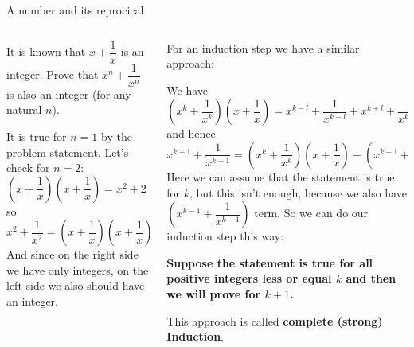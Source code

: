 \documentclass[9pt,aspectratio=169,handout]{beamer}
\begin{document}
\begin{frame}{A number and its reprocical}
  \begin{columns}[T]
    \begin{column}{0.5\textwidth}
      \begin{problem}
        It is known that $x + \dfrac{1}{x}$ is an integer. Prove that $x^{n} + \dfrac{1}{x^{n}}$ is also an integer (for any natural $n$).
      \end{problem}\pause
      It is true for $n=1$ by the problem statement. Let's check for $n=2$:
      \[
        \left(x + \dfrac{1}{x}\right) \left(x + \dfrac{1}{x}\right) = x^2 + 2 + \frac{1}{x^2},
      \] so
      \[ 
        x^2 + \frac{1}{x^2} = \left(x + \dfrac{1}{x}\right) \left(x + \dfrac{1}{x}\right) - 2.
      \]
      And since on the right side we have only integers, on the left side we also should have an integer.\pause
    \end{column}
    \begin{column}{0.5\textwidth}
      For an induction step we have a similar approach:

      We have 
      \[
        \left(x^k + \dfrac{1}{x^k}\right) \left(x + \dfrac{1}{x}\right) = x^{k-l} + \frac{1}{x^{k-l}} + x^{k+l} + \frac{1}{x^{k+1}}
      \] 
      and hence \pause
      \[
        x^{k+1} + \frac{1}{x^{k+1}} = \left(x^k + \frac{1}{x^k}\right)\left(x + \frac{1}{x}\right) - \left(x^{k-1} + \frac{1}{x^{k-1}}\right).
      \]\pause
      Here we can assume that the statement is true for $k$, but this isn't enough, because we also have $\left(x^{k-1} + \dfrac{1}{x^{k-1}}\right)$ term. So we can do our induction step this way: \pause

      \begin{definition}
        \textbf{Suppose the statement is true for all positive integers less or equal $k$ and then we will prove for $k+1$.}

        This approach is called \textbf{complete (strong) Induction}.
      \end{definition}

    \end{column}
  \end{columns}
\end{frame}
\end{document}
